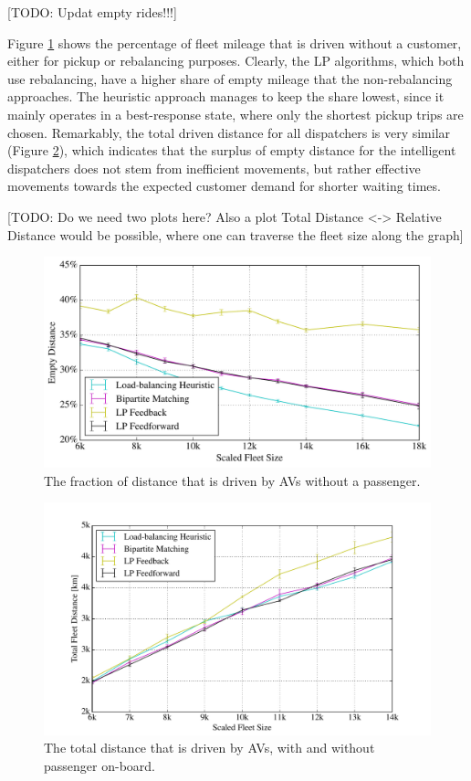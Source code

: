 [TODO: Updat empty rides!!!]

Figure \ref{fig:empty_rides} shows the percentage of fleet mileage that is driven
without a customer, either for pickup or rebalancing purposes. Clearly, the LP
algorithms, which both use rebalancing, have a higher share of empty mileage
that the non-rebalancing approaches. The heuristic approach manages to keep the
share lowest, since it mainly operates in a best-response state, where only the
shortest pickup trips are chosen. Remarkably, the total driven distance for all
dispatchers is very similar (Figure \ref{fig:total_distance}), which indicates
that the surplus of empty distance for the intelligent dispatchers does not stem
from inefficient movements, but rather effective movements towards the expected
customer demand for shorter waiting times.

[TODO: Do we need two plots here? Also a plot Total Distance <-> Relative Distance
would be possible, where one can traverse the fleet size along the graph]

\begin{figure}
\includegraphics[width=1.0\textwidth]{figures/empty_rides.pdf}
\caption{The fraction of distance that is driven by AVs without a passenger.}
\label{fig:empty_rides}
\end{figure}

\begin{figure}
\includegraphics[width=1.0\textwidth]{figures/total_distance.pdf}
\caption{The total distance that is driven by AVs, with and without passenger on-board.}
\label{fig:total_distance}
\end{figure}

